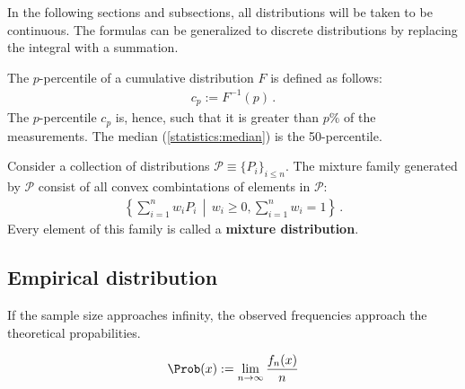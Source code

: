     In the following sections and subsections, all distributions will be taken to be continuous. The formulas can be generalized to discrete distributions by replacing the integral with a summation.

    \begin{definition}[Percentile]
        The $p$-percentile of a cumulative distribution $F$ is defined as follows:
        \begin{gather}
            c_p := F^{-1}(p)\,.
        \end{gather}
        The $p$-percentile $c_p$ is, hence, such that it is greater than $p\%$ of the measurements. The median (\cref{statistics:median}) is the 50-percentile.
    \end{definition}


    \begin{example}
        Consider a collection of distributions $\mathcal{P}\equiv\{P_i\}_{i\leq n}$. The mixture family generated by $\mathcal{P}$ consist of all convex combintations of elements in $\mathcal{P}$:
        \begin{gather}
            \left\{\sum_{i=1}^nw_iP_i\,\middle\vert\,w_i\geq0,\sum_{i=1}^nw_i = 1\right\}\,.
        \end{gather}
        Every element of this family is called a \textbf{mixture distribution}.
    \end{example}

\subsection{Empirical distribution}


    \begin{theorem}\label{statistics:large_numbers}
        If the sample size approaches infinity, the observed frequencies approach the theoretical propabilities.
    \end{theorem}
    \begin{result}
        \begin{gather}
            \label{statistics:frequentist_probability}
            \Prob(x) := \lim_{n\rightarrow\infty}\frac{f_n(x)}{n}
        \end{gather}
    \end{result}

